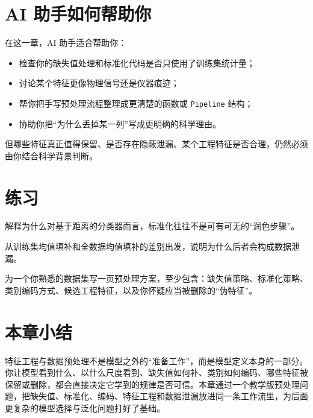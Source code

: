 \section{AI 助手如何帮助你}

在这一章，AI 助手适合帮助你：

\begin{itemize}
    \item 检查你的缺失值处理和标准化代码是否只使用了训练集统计量；
    \item 讨论某个特征更像物理信号还是仪器痕迹；
    \item 帮你把手写预处理流程整理成更清楚的函数或 \texttt{Pipeline} 结构；
    \item 协助你把“为什么丢掉某一列”写成更明确的科学理由。
\end{itemize}

但哪些特征真正值得保留、是否存在隐蔽泄漏、某个工程特征是否合理，仍然必须由你结合科学背景判断。

\section{练习}

\begin{exercisebox}[基础练习]
解释为什么对基于距离的分类器而言，标准化往往不是可有可无的“润色步骤”。
\end{exercisebox}

\begin{exercisebox}[进阶练习]
从训练集均值填补和全数据均值填补的差别出发，说明为什么后者会构成数据泄漏。
\end{exercisebox}

\begin{exercisebox}[开放练习]
为一个你熟悉的数据集写一页预处理方案，至少包含：缺失值策略、标准化策略、类别编码方式、候选工程特征，以及你怀疑应当被删除的“伪特征”。
\end{exercisebox}

\section{本章小结}

特征工程与数据预处理不是模型之外的“准备工作”，而是模型定义本身的一部分。你让模型看到什么、以什么尺度看到、缺失值如何补、类别如何编码、哪些特征被保留或删除，都会直接决定它学到的规律是否可信。本章通过一个教学版预处理问题，把缺失值、标准化、编码、特征工程和数据泄漏放进同一条工作流里，为后面更复杂的模型选择与泛化问题打好了基础。
